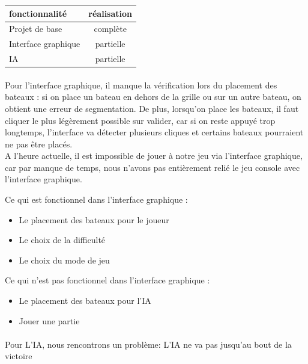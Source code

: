 \documentclass[a4paper,oneside]{article}
\begin{document}
\begin{tabular}{| l | c |}
\hline
fonctionnalité & réalisation \\
\hline
\hline
Projet de base & complète \\
\hline
Interface graphique & partielle \\
\hline
IA & partielle \\
\hline
\end{tabular}

\paragraph{}
Pour l'interface graphique, il manque la vérification lors du placement des bateaux : si on place un bateau en dehors de la grille ou sur un autre bateau, on obtient une erreur de segmentation. De plus, lorsqu'on place les bateaux, il faut cliquer le plus légèrement possible sur valider, car si on reste appuyé trop longtemps, l'interface va détecter plusieurs cliques et certains bateaux pourraient ne pas être placés.
\newline
\\

A l'heure actuelle, il est impossible de jouer à notre jeu via l'interface graphique, car par manque de temps, nous n'avons pas entièrement relié le jeu console avec l'interface graphique.


Ce qui est fonctionnel dans l'interface graphique :
\begin{itemize}
	\item Le placement des bateaux pour le joueur
	\item Le choix de la difficulté
	\item Le choix du mode de jeu
	\newline
	\\
\end{itemize}

Ce qui n'est pas fonctionnel dans l'interface graphique :
\begin{itemize}
	\item Le placement des bateaux pour l'IA
	\item Jouer une partie
\end{itemize}

\paragraph{}
Pour L'IA, nous rencontrons un problème: L'IA ne va pas jusqu'au bout de la victoire
\end{document}
